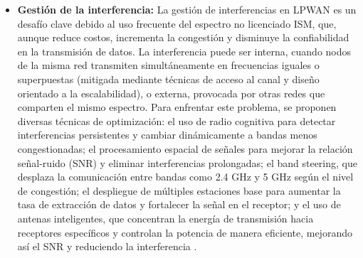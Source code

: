 \begin{itemize}
            radio (por ejemplo, Spreading Factor y  frecuencia  portadora)  para
            reducir colisiones y aumentar la tasa de entrega de datos, el uso de
            esquemas de corrección de  errores  y  redundancia  adaptativa  para
            incrementar la tasa de entrega de paquetes, modelos analíticos  para
            estimar la tasa de error de bit con mayor precisión y mecanismos  de
            enrutamiento  multi-salto  basados  en  aprendizaje   por   refuerzo
            (Q-learning) que consideran retardo, interferencia, uso de ancho  de
            banda y eficiencia energética.  No  obstante,  el  diseño  de  LPWAN
            implica compromisos entre variables como ancho de banda  y  tasa  de
            datos, así como decisiones sobre  espectro,  modulación,  acceso  al
            canal y duplexidad, cuyos impactos pueden  ser  altos,  moderados  o
            bajos     según     el     objetivo     de     desempeño     buscado
            \parencite[]{chilamkurthy2022low}.
      \item \textbf{Gestión de la interferencia:} La gestión de interferencias
            en LPWAN es un desafío clave debido al uso frecuente del espectro no
            licenciado ISM, que, aunque reduce costos, incrementa la  congestión
            y  disminuye  la  confiabilidad  en  la  transmisión  de  datos.  La
            interferencia puede ser  interna,  cuando  nodos  de  la  misma  red
            transmiten simultáneamente en  frecuencias  iguales  o  superpuestas
            (mitigada mediante técnicas de acceso al canal y diseño orientado  a
            la  escalabilidad),  o  externa,  provocada  por  otras  redes   que
            comparten el  mismo  espectro.  Para  enfrentar  este  problema,  se
            proponen  diversas  técnicas  de  optimización:  el  uso  de   radio
            cognitiva  para  detectar  interferencias  persistentes  y   cambiar
            dinámicamente  a  bandas  menos  congestionadas;  el   procesamiento
            espacial de señales para mejorar la  relación  señal-ruido  (SNR)  y
            eliminar interferencias prolongadas; el band steering, que  desplaza
            la comunicación entre bandas como 2.4 GHz y 5 GHz según el nivel  de
            congestión; el despliegue de múltiples estaciones base para aumentar
            la tasa de extracción de datos y fortalecer la señal en el receptor;
            y el uso de antenas  inteligentes,  que  concentran  la  energía  de
            transmisión hacia receptores específicos y controlan la potencia  de
            manera eficiente, mejorando así el SNR y reduciendo la interferencia
            \parencite[]{chilamkurthy2022low}.
\end{itemize}


